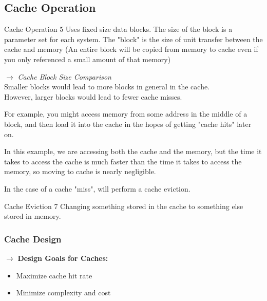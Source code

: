\documentclass{report}
\begin{document}
  \subsection{Cache Operation}
  \begin{example} {Cache Operation} { 5 }
   Uses fixed size data blocks. The size of the block is a parameter set for each system. The "block" is the size of unit transfer between the cache and memory (An entire block will be copied from memory to cache even if you only referenced a small amount of that memory) \\

   \begin{note} 
     $\to$ \emph{Cache Block Size Comparison} \\
    Smaller blocks would lead to more blocks in general in the cache. \\
    However, larger blocks would lead to fewer cache misses. \\
   \end{note}

    For example, you might access memory from some address in the middle of a block, and then load it into the cache in the hopes of getting "cache hits" later on. \\

    \par In this example, we are accessing both the cache and the memory, but the time it takes to access the cache is much faster than the time it takes to access the memory, so moving to cache is nearly negligible. \\
    \par In the case of a cache "miss", will perform a cache eviction.
    \begin{definition} {Cache Eviction} { 7 }
     Changing something stored in the cache to something else stored in memory. \\
    \end{definition}

  \end{example}

  \subsubsection{Cache Design} 
    $\to$ \textbf{Design Goals for Caches:} 
    \begin{itemize} 
      \item Maximize cache hit rate
      \item Minimize complexity and cost \\
    \end{itemize}
\end{document}
